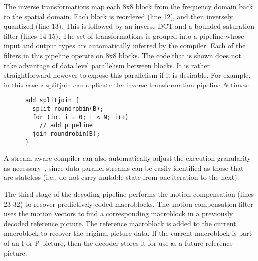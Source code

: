 The inverse transformations map each 8x8 block from the frequency
domain back to the spatial domain. Each block is reordered
(line 12), and then inversely quantized (line 13). This is followed by
an inverse DCT and a bounded saturation filter (lines 14-15). The set
of transformations is grouped into a pipeline whose input
and output types are automatically inferred by the compiler. Each of
the filters in this pipeline operate on 8x8 blocks. The code that is
shown does not take advantage of data level parallelism between
blocks. It is rather straightforward however to expose this
parallelism if it is desirable. For example, in this case a splitjoin
can replicate the inverse transformation pipeline $N$ times:
\begin{center}
  \begin{scriptsize}
    \begin{verbatim}
      add splitjoin {
        split roundrobin(B);
        for (int i = 0; i < N; i++) 
          // add pipeline
        join roundrobin(B);
      }
    \end{verbatim}
  \end{scriptsize}
\end{center}
\vspace{-12pt}
A stream-aware compiler can also automatically adjust the execution
granularity as necessary~\cite{gordon02asplos}, since data-parallel streams
can be easily identified as those that are stateless (i.e., do not
carry mutable state from one iteration to the next).

The third stage of the decoding pipeline performs the motion
compensation (lines 23-32) to recover predictively coded
macroblocks. The motion compensation filter uses the motion vectors to
find a corresponding macroblock in a previously decoded reference
picture. The reference macroblock is added to the current macroblock
to recover the original picture data. If the current macroblock is
part of an I or P picture, then the decoder stores it for use as a
future reference picture.

